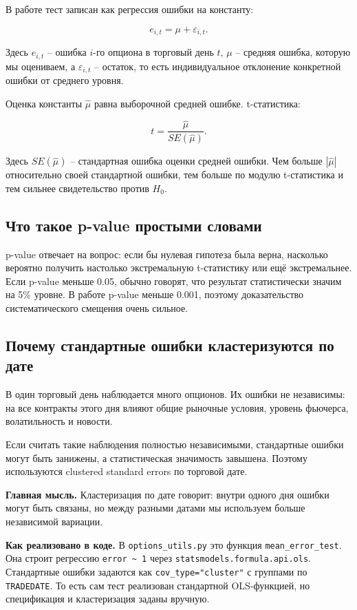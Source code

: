 \documentclass[11pt,a4paper]{article}
\newcommand{\key}[1]{%
  \vspace{0.15em}
  \noindent\colorbox{softblue}{%
    \parbox{\dimexpr\linewidth-2\fboxsep\relax}{\textbf{Главная мысль.} #1}%
  }\vspace{0.2em}
}
\newcommand{\impl}[1]{%
  \vspace{0.15em}
  \noindent\colorbox{softblue}{%
    \parbox{\dimexpr\linewidth-2\fboxsep\relax}{\textbf{Как реализовано в коде.} #1}%
  }\vspace{0.2em}
}
\begin{document}
В работе тест записан как регрессия ошибки на константу:

\begin{equation}
e_{i,t}=\mu+\varepsilon_{i,t}.
\end{equation}

Здесь $e_{i,t}$ -- ошибка $i$-го опциона в торговый день $t$, $\mu$ -- средняя ошибка, которую мы оцениваем, а $\varepsilon_{i,t}$ -- остаток, то есть индивидуальное отклонение конкретной ошибки от среднего уровня.

Оценка константы $\hat{\mu}$ равна выборочной средней ошибке. t-статистика:

\begin{equation}
t =
\frac{\hat{\mu}}{SE(\hat{\mu})}.
\end{equation}

Здесь $SE(\hat{\mu})$ -- стандартная ошибка оценки средней ошибки. Чем больше $|\hat{\mu}|$ относительно своей стандартной ошибки, тем больше по модулю t-статистика и тем сильнее свидетельство против $H_0$.

\subsection{Что такое p-value простыми словами}

p-value отвечает на вопрос: если бы нулевая гипотеза была верна, насколько вероятно получить настолько экстремальную t-статистику или ещё экстремальнее. Если p-value меньше 0.05, обычно говорят, что результат статистически значим на 5\% уровне. В работе p-value меньше 0.001, поэтому доказательство систематического смещения очень сильное.
\subsection{Почему стандартные ошибки кластеризуются по дате}

В один торговый день наблюдается много опционов. Их ошибки не независимы: на все контракты этого дня влияют общие рыночные условия, уровень фьючерса, волатильность и новости.

Если считать такие наблюдения полностью независимыми, стандартные ошибки могут быть занижены, а статистическая значимость завышена. Поэтому используются clustered standard errors по торговой дате.

\key{Кластеризация по дате говорит: внутри одного дня ошибки могут быть связаны, но между разными датами мы используем больше независимой вариации.}

\impl{В \texttt{options\_utils.py} это функция \texttt{mean\_error\_test}. Она строит регрессию \texttt{error \textasciitilde{} 1} через \texttt{statsmodels.formula.api.ols}. Стандартные ошибки задаются как \texttt{cov\_type="cluster"} с группами по \texttt{TRADEDATE}. То есть сам тест реализован стандартной OLS-функцией, но спецификация и кластеризация заданы вручную.}
\end{document}
